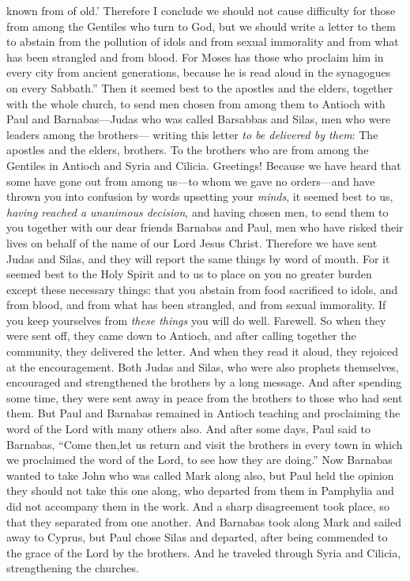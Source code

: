 \begin{biblechapter}
\verse known from of old.’
\verse Therefore I conclude we should not cause difficulty for those from among the Gentiles who turn to God,
\verse but we should write a letter to them to abstain from the pollution of idols and from sexual immorality and from what has been strangled and from blood.
\verse For Moses has those who proclaim him in every city from ancient generations, because he is read aloud in the synagogues on every Sabbath.”
 Then it seemed best to the apostles and the elders, together with the whole church, to send men chosen from among them to Antioch with Paul and Barnabas—Judas who was called Barsabbas and Silas, men who were leaders among the brothers—
\verse writing this letter \textit{to be delivered by them}: The apostles and the elders, brothers. To the brothers who are from among the Gentiles in Antioch and Syria and Cilicia. Greetings!
\verse Because we have heard that some have gone out from among us—to whom we gave no orders—and have thrown you into confusion by words upsetting your \textit{minds},
\verse it seemed best to us, \textit{having reached a unanimous decision}, and having chosen men, to send them to you together with our dear friends Barnabas and Paul,
\verse men who have risked their lives on behalf of the name of our Lord Jesus Christ.
\verse Therefore we have sent Judas and Silas, and they will report the same things by word of mouth.
\verse For it seemed best to the Holy Spirit and to us to place on you no greater burden except these necessary things:
\verse that you abstain from food sacrificed to idols, and from blood, and from what has been strangled, and from sexual immorality. If you keep yourselves from \textit{these things} you will do well. Farewell.
 So when they were sent off, they came down to Antioch, and after calling together the community, they delivered the letter.
\verse And when they read it aloud, they rejoiced at the encouragement.
\verse Both Judas and Silas, who were also prophets themselves, encouraged and strengthened the brothers by a long message.
\verse And after spending some time, they were sent away in peace from the brothers to those who had sent them.
\verse But Paul and Barnabas remained in Antioch teaching and proclaiming the word of the Lord with many others also.
 And after some days, Paul said to Barnabas, “Come then,let us return and visit the brothers in every town in which we proclaimed the word of the Lord, to see how they are doing.”
\verse Now Barnabas wanted to take John who was called Mark along also,
\verse but Paul held the opinion they should not take this one along, who departed from them in Pamphylia and did not accompany them in the work.
\verse And a sharp disagreement took place, so that they separated from one another. And Barnabas took along Mark and sailed away to Cyprus,
\verse but Paul chose Silas and departed, after being commended to the grace of the Lord by the brothers.
\verse And he traveled through Syria and Cilicia, strengthening the churches.
\end{biblechapter}

